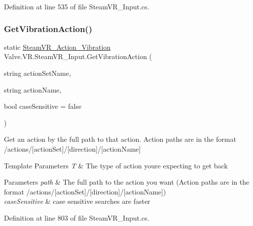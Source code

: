Definition at line 535 of file Steam\+V\+R\+\_\+\+Input.\+cs.

\mbox{\label{class_valve_1_1_v_r_1_1_steam_v_r___input_addb242c75f24ea3622e5960a74d345ee}} 
\subsubsection{\texorpdfstring{GetVibrationAction()}{GetVibrationAction()}\hspace{0.1cm}{\footnotesize\ttfamily [1/2]}}
{\footnotesize\ttfamily static \mbox{\hyperlink{class_valve_1_1_v_r_1_1_steam_v_r___action___vibration}{Steam\+V\+R\+\_\+\+Action\+\_\+\+Vibration}} Valve.\+V\+R.\+Steam\+V\+R\+\_\+\+Input.\+Get\+Vibration\+Action (\begin{DoxyParamCaption}\item[{string}]{action\+Set\+Name,  }\item[{string}]{action\+Name,  }\item[{bool}]{case\+Sensitive = {\ttfamily false} }\end{DoxyParamCaption})\hspace{0.3cm}{\ttfamily [static]}}



Get an action by the full path to that action. Action paths are in the format /actions/\mbox{[}action\+Set\mbox{]}/\mbox{[}direction\mbox{]}/\mbox{[}action\+Name\mbox{]} 


\begin{DoxyTemplParams}{Template Parameters}
{\em T} & The type of action you\textquotesingle{}re expecting to get back\\
\hline
\end{DoxyTemplParams}

\begin{DoxyParams}{Parameters}
{\em path} & The full path to the action you want (Action paths are in the format /actions/\mbox{[}action\+Set\mbox{]}/\mbox{[}direction\mbox{]}/\mbox{[}action\+Name\mbox{]})\\
\hline
{\em case\+Sensitive} & case sensitive searches are faster\\
\hline
\end{DoxyParams}


Definition at line 803 of file Steam\+V\+R\+\_\+\+Input.\+cs.

